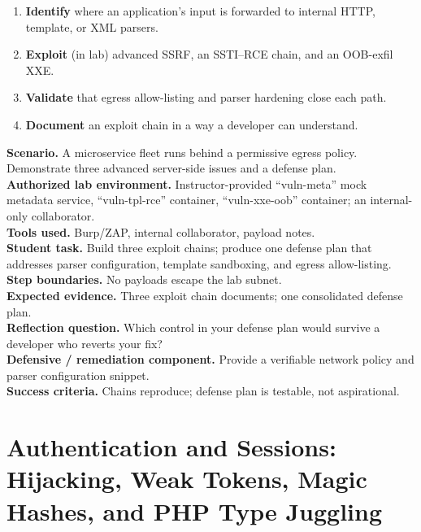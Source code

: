 \documentclass[11pt,letterpaper,oneside]{report}
\begin{document}
\begin{outcomes}
\begin{enumerate}
  \item \textbf{Identify} where an application's input is forwarded to internal HTTP, template, or XML parsers.
  \item \textbf{Exploit} (in lab) advanced SSRF, an SSTI--RCE chain, and an OOB-exfil XXE.
  \item \textbf{Validate} that egress allow-listing and parser hardening close each path.
  \item \textbf{Document} an exploit chain in a way a developer can understand.
\end{enumerate}
\end{outcomes}

\begin{labbox}
\textbf{Scenario.} A microservice fleet runs behind a permissive egress policy. Demonstrate three advanced server-side issues and a defense plan.\\[3pt]
\textbf{Authorized lab environment.} Instructor-provided ``vuln-meta'' mock metadata service, ``vuln-tpl-rce'' container, ``vuln-xxe-oob'' container; an internal-only collaborator.\\[3pt]
\textbf{Tools used.} Burp/ZAP, internal collaborator, payload notes.\\[3pt]
\textbf{Student task.} Build three exploit chains; produce one defense plan that addresses parser configuration, template sandboxing, and egress allow-listing.\\[3pt]
\textbf{Step boundaries.} No payloads escape the lab subnet.\\[3pt]
\textbf{Expected evidence.} Three exploit chain documents; one consolidated defense plan.\\[3pt]
\textbf{Reflection question.} Which control in your defense plan would survive a developer who reverts your fix?\\[3pt]
\textbf{Defensive / remediation component.} Provide a verifiable network policy and parser configuration snippet.\\[3pt]
\textbf{Success criteria.} Chains reproduce; defense plan is testable, not aspirational.
\end{labbox}

\chapter{Authentication and Sessions: Hijacking, Weak Tokens, Magic Hashes, and PHP Type Juggling}
\end{document}
